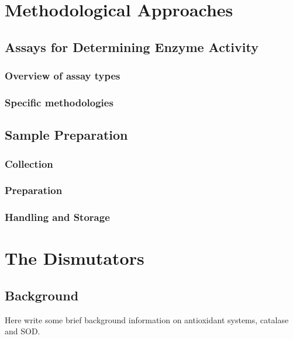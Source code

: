 \documentclass[
  9pt,
  american,
  a5paper,
  extrafontsizes,onecolumn,openright
  ]{memoir}
\begin{document}
\part{Methodological Approaches}\label{part-methodological-approaches}

\chapter{Assays for Determining Enzyme Activity}\label{assays-for-determining-enzyme-activity}

\section{Overview of assay types}\label{overview-of-assay-types}

\section{Specific methodologies}\label{specific-methodologies}

\chapter{Sample Preparation}\label{sample-preparation}

\section{Collection}\label{collection}

\section{Preparation}\label{preparation}

\section{Handling and Storage}\label{handling-and-storage}

\part{The Dismutators}\label{part-the-dismutators}

\chapter{Background}\label{background}

Here write some brief background information on antioxidant systems, catalase and SOD.
\end{document}
